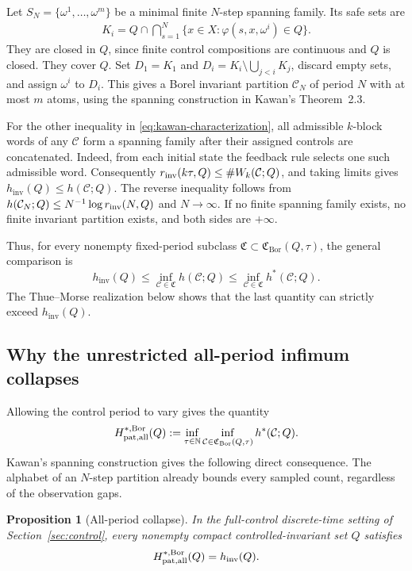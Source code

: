 \documentclass[11pt,reqno]{amsart}
\numberwithin{equation}{section}
\newtheorem{proposition}[theorem]{Proposition}
\theoremstyle{definition}
\theoremstyle{definition}
\newcommand{\N}{\mathbb N}
\newcommand{\C}{\mathcal C}
\newcommand{\hpat}{h^{*}}
\newcommand{\hinv}{h_{\mathrm{inv}}}
\newcommand{\Bor}{\mathrm{Bor}}
\begin{document}
Let $S_N=\{\omega^1,\ldots,\omega^m\}$ be a minimal finite
$N$-step spanning family. Its safe sets are
\begin{align*}
 K_i=Q\cap\bigcap_{s=1}^{N}
       \{x\in X:\varphi(s,x,\omega^i)\in Q\}.
\end{align*}
They are closed in $Q$, since finite control compositions are continuous
and $Q$ is closed. They cover $Q$. Set
$D_1=K_1$ and $D_i=K_i\setminus\bigcup_{j<i}K_j$, discard empty sets,
and assign $\omega^i$ to $D_i$. This gives a Borel invariant partition $\C_N$ of period $N$
with at most $m$ atoms, using the spanning construction in Kawan's
Theorem~2.3.

For the other inequality in \eqref{eq:kawan-characterization}, all
admissible $k$-block words of any $\C$ form a spanning family after their
assigned controls are concatenated. Indeed, from each initial state the
feedback rule selects one such admissible word. Consequently
$r_{\rm inv}(k\tau,Q)\le\#W_k(\C;Q)$, and taking limits gives
$\hinv(Q)\le h(\C;Q)$. The reverse inequality follows from
$h(\C_N;Q)\le N^{-1}\log r_{\rm inv}(N,Q)$ and $N\to\infty$.
If no finite spanning family exists, no finite invariant partition exists,
and both sides are $+\infty$.

Thus, for every nonempty fixed-period subclass
$\mathfrak C\subset\mathfrak C_{\Bor}(Q,\tau)$, the general comparison is
\begin{equation}\label{eq:three-quantities}
 \hinv(Q)
 \le\inf_{\C\in\mathfrak C}h(\C;Q)
 \le\inf_{\C\in\mathfrak C}\hpat(\C;Q).
\end{equation}
The Thue--Morse realization below shows that the last quantity can
strictly exceed $\hinv(Q)$.

\subsection{Why the unrestricted all-period infimum collapses}
Allowing the control period to vary gives the quantity
\begin{align*}
 H_{\rm pat,all}^{*,\Bor}(Q)
 :=\inf_{\tau\in\N}\inf_{\C\in\mathfrak C_{\Bor}(Q,\tau)}
       \hpat(\C;Q).
\end{align*}
Kawan's spanning construction gives the following direct consequence.
The alphabet of an $N$-step partition already bounds every sampled
count, regardless of the observation gaps.

\begin{proposition}[All-period collapse]\label{prop:all-period-collapse}
In the full-control discrete-time setting of Section~\ref{sec:control}, every
nonempty compact controlled-invariant set $Q$ satisfies
\begin{equation}\label{eq:all-period-collapse}
 H_{\rm pat,all}^{*,\Bor}(Q)=\hinv(Q).
\end{equation}
\end{proposition}
\end{document}
